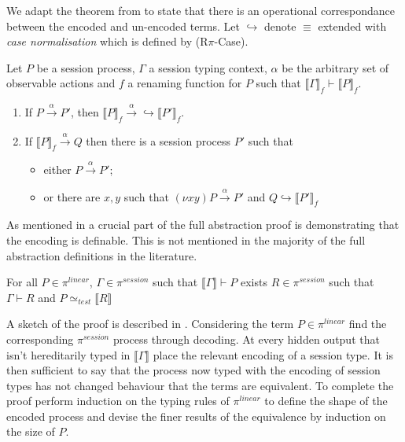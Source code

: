 We adapt the theorem from \citep{dardha2017session} to state that there is an operational correspondance between the encoded and un-encoded terms. Let $\hookrightarrow$ denote $\equiv$ extended with \textit{case normalisation} which is defined by (R$\pi$-Case).
\vspace{10pt}
\begin{theorem}
    Let $P$ be a session process, $\Gamma$ a session typing context, $\alpha$ be the arbitrary set of observable actions and $f$ a renaming function for $P$ such that $\llbracket \Gamma \rrbracket_f \vdash \llbracket P \rrbracket_f$.
    
    \begin{enumerate}
        \item If $P \xrightarrow{\alpha} P'$, then $\llbracket P \rrbracket_f \xrightarrow{\alpha}\hookrightarrow \llbracket P' \rrbracket_f$.
        \item If $\llbracket P \rrbracket_f \xrightarrow{\alpha} Q$ then there is a session process $P'$ such that
        \begin{itemize}
            \item either $P \xrightarrow{\alpha} P'$;
            \item or there are $x, y$ such that $(\nu xy)P \xrightarrow{\alpha} P'$ and $Q \hookrightarrow \llbracket P' \rrbracket_f$
        \end{itemize}
    \end{enumerate}
    \label{Lem:OperationalCorr}
\end{theorem}

As mentioned in \citep{demangeon2011full} a crucial part of the full abstraction proof is demonstrating that the encoding is definable. This is not mentioned in the majority of the full abstraction definitions in the literature.
\vspace{10pt}
\begin{lemma}[Definability]
    For all $P \in \pi^{linear}$, $\Gamma \in \pi^{session}$ such that $\llbracket \Gamma \rrbracket \vdash P$ exists $R \in \pi^{session}$ such that $\Gamma \vdash R$ and $P \simeq_{test} \llbracket R \rrbracket$
    \label{Lem:Definability}
\end{lemma}

A sketch of the proof is described in \citep{demangeon2011full}. Considering the term $P \in \pi^{linear}$ find the corresponding $\pi^{session}$ process through decoding. At every hidden output that isn't hereditarily typed in $\llbracket \Gamma \rrbracket$ place the relevant encoding of a session type. It is then sufficient to say that the process now typed with the encoding of session types has not changed behaviour that the terms are equivalent. To complete the proof perform induction on the typing rules of $\pi^{linear}$ to define the shape of the encoded process and devise the finer results of the equivalence by induction on the size of $P$. 

